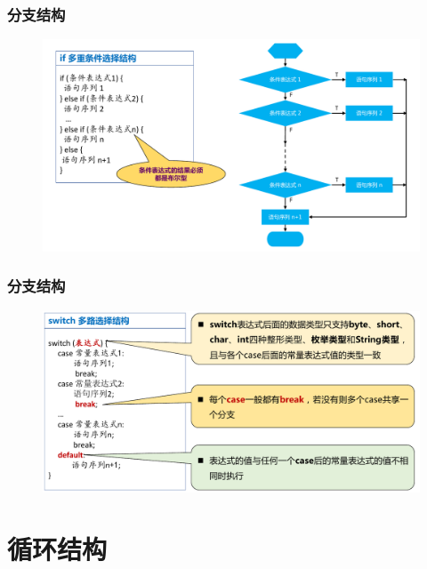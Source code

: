 \begin{frame}[fragile]
  \frametitle{分支结构}

  
  \begin{figure}
    \centering
    \includegraphics[width=\textwidth]{ppt/flow-control-2.pdf}
  \end{figure}

\end{frame}

\begin{frame}[fragile]
  \frametitle{分支结构}

  
  \begin{figure}
    \centering
    \includegraphics[width=.8\textwidth]{ppt/flow-control-3.pdf}
  \end{figure}

\end{frame}

\section{循环结构}

